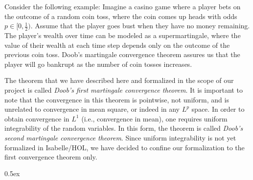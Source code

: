 \documentclass[11pt,a4paper]{article}
\begin{document}
Consider the following example: Imagine a casino game where a player bets on the outcome of a random coin toss, where the coin comes up heads with odds $p \in [0, \frac{1}{2})$. Assume that the player goes bust when they have no money remaining. The player's wealth over time can be modeled as a supermartingale, where the value of their wealth at each time step depends only on the outcome of the previous coin toss. Doob's martingale convergence theorem assures us that the player will go bankrupt as the number of coin tosses increases.

The theorem that we have described here and formalized in the scope of our project is called \textit{Doob's first martingale convergence theorem}.
It is important to note that the convergence in this theorem is pointwise, not uniform, and is unrelated to convergence in mean square, or indeed in any $L^p$ space. In order to obtain convergence in $L^1$ (i.e., convergence in mean), one requires uniform integrability of the random variables. In this form, the theorem is called \textit{Doob's second martingale convergence theorem}. Since uniform integrability is not yet formalized in Isabelle/HOL, we have decided to confine our formalization to the first convergence theorem only.

\pagebreak

\parindent 0pt\parskip 0.5ex





\end{document}
